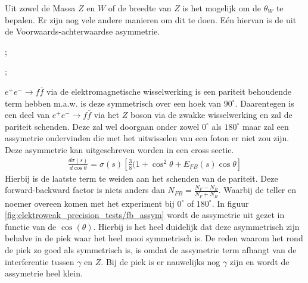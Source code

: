 \documentclass[../main.tex]{subfiles}
\begin{document}
Uit zowel de Massa $Z$ en $W$ of de breedte van $Z$ is het mogelijk om de $\theta_W$ te bepalen. Er zijn nog vele andere manieren om dit te doen. Eén hiervan is de uit de Voorwaards-achterwaardse asymmetrie.\\
\begin{minipage}[c]{0.5\textwidth}
    \begin{center}
        ;
    \end{center}
\end{minipage}\noindent
\begin{minipage}[c]{0.5\textwidth}
    \begin{center}
        ;
    \end{center}
\end{minipage}
$e^+e^-\rightarrow f\overline f$ via de elektromagnetische wisselwerking is een pariteit behoudende term hebben m.a.w. is deze symmetrisch over een hoek van $90^\circ$. Daarentegen is een deel van $e^+e^-\rightarrow f\overline f$ via het $Z$ boson via de zwakke wisselwerking en zal de pariteit schenden. Deze zal wel doorgaan onder zowel $0^\circ$ als $180^\circ$ maar zal een assymetrie ondervinden die met het uitwisselen van een foton er niet zou zijn. Deze asymmetrie kan uitgeschreven worden in een cross sectie.
\begin{equation}
    \begin{aligned}
        \label{eq:fb_assym}
        \frac{d\sigma(s)}{d\cos\theta} = \sigma(s) \left[ \frac{3}{8} (1+\cos^2\theta + E_{FB}(s) \cos\theta \right]
    \end{aligned}
\end{equation}
Hierbij is de laatste term te weiden aan het schenden van de pariteit. Deze forward-backward factor is niets anders dan $N_{FB} = \frac{N_F-N_B}{N_F+N_B}$. Waarbij de teller en noemer overeen komen met het experiment bij $0^\circ$ of $180^\circ$. In figuur \ref{fig:elektroweak_precision_tests/fb_assym} wordt de assymetrie uit gezet in functie van de $\cos(\theta)$. Hierbij is het heel duidelijk dat deze asymmetrisch zijn behalve in de piek waar het heel mooi symmetrisch is. De reden waarom het rond de piek zo goed als symmetrisch is, is omdat de assymetrie term afhangt van de interferentie tussen $\gamma$ en $Z$. Bij de piek is er nauwelijks nog $\gamma$ zijn en wordt de assymetrie heel klein.
\end{document}
